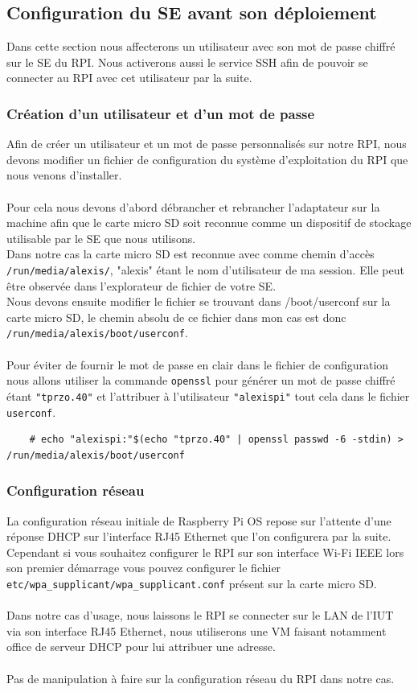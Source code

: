 \documentclass[a4paper]{article}
\begin{document}
\subsection{Configuration du SE avant son déploiement}
Dans cette section nous affecterons un utilisateur avec son mot de passe chiffré sur le SE du RPI. Nous activerons aussi le service SSH afin de pouvoir se connecter au RPI avec cet utilisateur par la suite.
\subsubsection{Création d'un utilisateur et d'un mot de passe}
\label{sec:sec03}
Afin de créer un utilisateur et un mot de passe personnalisés sur notre RPI, nous devons modifier un fichier de configuration du système d'exploitation du RPI que nous venons d'installer.\\\\Pour cela nous devons d'abord débrancher et rebrancher l'adaptateur sur la machine afin que le carte micro SD soit reconnue comme un dispositif de stockage utilisable par le SE que nous utilisons.\\Dans notre cas la carte micro SD est reconnue avec comme chemin d'accès \verb|/run/media/alexis/|, "alexis" étant le nom d'utilisateur de ma session. Elle peut être observée dans l'explorateur de fichier de votre SE.\\Nous devons ensuite modifier le fichier se trouvant dans /boot/userconf sur la carte micro SD, le chemin absolu de ce fichier dans mon cas est donc \verb|/run/media/alexis/boot/userconf|.\\\\Pour éviter de fournir le mot de passe en clair dans le fichier de configuration nous allons utiliser la commande \verb|openssl| pour générer un mot de passe chiffré étant \verb|"tprzo.40"| et l'attribuer à l'utilisateur \verb|"alexispi"| tout cela dans le fichier \verb|userconf|.
\begin{lstlisting}
    # echo "alexispi:"$(echo "tprzo.40" | openssl passwd -6 -stdin) > /run/media/alexis/boot/userconf
\end{lstlisting}
\subsubsection{Configuration réseau}
La configuration réseau initiale de Raspberry Pi OS repose sur l'attente d'une réponse DHCP sur l'interface RJ45 Ethernet que l'on configurera par la suite.\\Cependant si vous souhaitez configurer le RPI sur son interface Wi-Fi IEEE lors son premier démarrage vous pouvez configurer le fichier \verb|etc/wpa_supplicant/wpa_supplicant.conf| présent sur la carte micro SD.\\\\Dans notre cas d'usage, nous laissons le RPI se connecter sur le LAN de l'IUT via son interface RJ45 Ethernet, nous utiliserons une VM faisant notamment office de serveur DHCP pour lui attribuer une adresse.\\\\Pas de manipulation à faire sur la configuration réseau du RPI dans notre cas.
\end{document}
